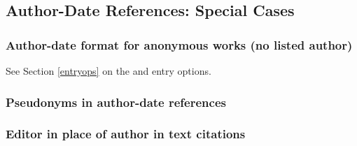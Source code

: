 \documentclass[11pt,letterpaper,oneside]{article}
\begin{document}
\begin{citeref}
\item \parencite[218]{fogel2004b}
\item \parencite[45--46]{fogel2004a}
\end{citeref}

\setcounter{subsection}{1}
\subsection{Author-Date References: Special Cases}
\setcounter{subsection}{15}

\setcounter{subsubsection}{33}
\subsubsection{Author-date format for anonymous works (no listed author)}

See Section \ref{entryops} on the  and 
entry options.

\begin{citeref}
\item \parencite{anon1610}
\item \parencite{anon1547}
\item \parencite{horsley1796}
\item \parencite{hawkes1834}
\end{citeref}

\subsubsection{Pseudonyms in author-date references}

\begin{citeref}
\item \parencite{stendhal1925}
\end{citeref}

\subsubsection{Editor in place of author in text citations}

\begin{citeref}
\item \parencite{silverstein1974}
\item \parencite{soltes1999}
\end{citeref}
\end{document}
